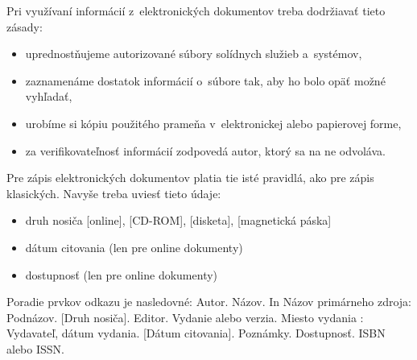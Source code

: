 Pri využívaní informácií z~elektronických dokumentov  treba
dodržiavať\/ tieto zásady:
\begin{itemize}
\item  uprednostňujeme autorizované súbory solídnych služieb
a~systémov,
\item zaznamenáme dostatok informácií o~súbore tak, aby ho bolo opäť\/
možné vyhľadať\/,
\item urobíme si kópiu použitého prameňa v~elektronickej alebo
papierovej forme,
\item za verifikovateľnosť\/ informácií zodpovedá autor, ktorý sa na
ne odvoláva.
\end{itemize}

Pre zápis elektronických dokumentov platia tie isté pravidlá, ako pre
zápis klasických. Navyše treba uviesť\/ tieto údaje:
\begin{itemize}
\item  druh nosiča  [online], [CD-ROM], [disketa], [magnetická páska]
\item dátum citovania  (len pre online dokumenty)
\item dostupnosť\/  (len pre online dokumenty)
\end{itemize}

Poradie prvkov odkazu je nasledovné:
Autor. Názov. In Názov primárneho zdroja: Podnázov. [Druh  nosiča].
Editor. Vydanie alebo verzia. Miesto vydania : Vydavateľ, dátum
vydania. [Dátum citovania]. Poznámky.  Dostupnosť\/. ISBN alebo ISSN.